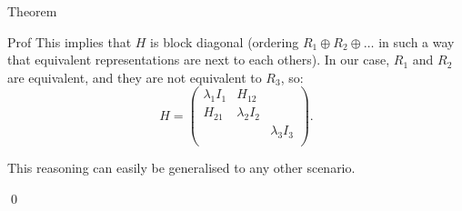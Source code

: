 \documentclass[a4paper]{article}
\begin{document}
\begin{parag}{Theorem}
\begin{subparag}{Prof}
        This implies that $H$ is block diagonal (ordering $R_1 \oplus R_2 \oplus \ldots$ in such a way that equivalent representations are next to each others). In our case, $R_1$ and $R_2$ are equivalent, and they are not equivalent to $R_3$, so: 
        \[H = \begin{pmatrix} \lambda_1 I_1 & H_{12} &   \\ H_{21} & \lambda_2 I_2 &   \\  &  & \lambda_3 I_3  \\  &  &  \end{pmatrix}.\]

        This reasoning can easily be generalised to any other scenario.

        \qed
    \end{subparag}
\end{parag}
\end{document}
